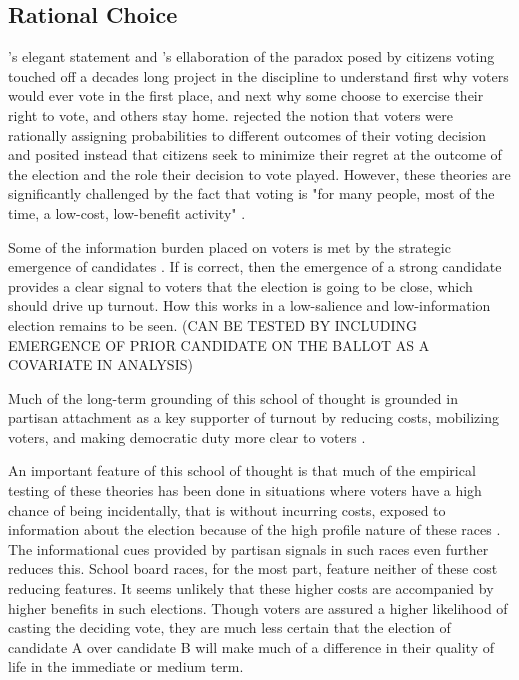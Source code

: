 \subsection{Rational Choice}

\citet{Downs57}'s elegant statement and \citet{VoteCalculus68}'s ellaboration of the paradox 
posed by citizens voting touched off a decades long project in the discipline to understand first 
why voters would ever vote in the first place, and next why some choose to exercise 
their right to vote, and others stay home. \citet{nonvoting74} rejected the notion 
that voters were rationally assigning probabilities to different outcomes of their 
voting decision and posited instead that citizens seek to minimize their regret 
at the outcome of the election and the role their decision to vote played. However, 
these theories are significantly challenged by the fact that voting is "for many 
people, most of the time, a low-cost, low-benefit activity" \citep{aldrich1993}. 

Some of the information burden placed on voters is met by the strategic emergence 
of candidates \citep{aldrich1993}. If \citep{JacobsonBook} is correct, then the 
emergence of a strong candidate provides a clear signal to voters that the election 
is going to be close, which should drive up turnout. How this works in a low-salience 
and low-information election remains to be seen. (CAN BE TESTED BY INCLUDING EMERGENCE 
OF PRIOR CANDIDATE ON THE BALLOT AS A COVARIATE IN ANALYSIS)

Much of the long-term grounding of this school of thought is grounded in partisan 
attachment as a key supporter of turnout by reducing costs, mobilizing voters, and 
making democratic duty more clear to voters \citep{aldrich1993}. 

An important feature of this school of thought is that much of the empirical testing 
of these theories has been done in situations where voters have a high chance of being 
incidentally, that is without incurring costs, exposed to information about the election 
because of the high profile nature of these races \citep{aldrich1993}. The informational 
cues provided by partisan signals in such races even further reduces this. School board
races, for the most part, feature neither of these cost reducing features. It seems unlikely 
that these higher costs are accompanied by higher benefits in such elections. Though 
voters are assured a higher likelihood of casting the deciding vote, they are much less certain 
that the election of candidate A over candidate B will make much of a difference in 
their quality of life in the immediate or medium term. 

